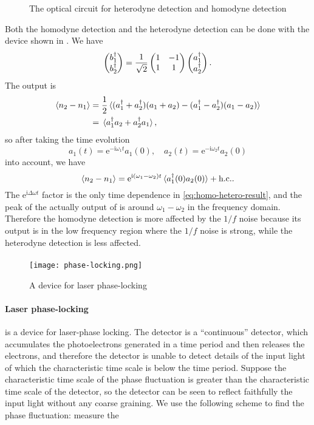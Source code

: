 \documentclass[hyperref, a4paper]{article}
\newcommand*{\ii}{\mathrm{i}}
\newcommand*{\ee}{\mathrm{e}}
\begin{document}
\begin{figure}
    \centering
    
    \caption{The optical circuit for heterodyne detection and homodyne detection}
    \label{fig:hom-hetero-device}
\end{figure}

Both the homodyne detection and the heterodyne detection can be done with the device shown in .
We have 
\[
    \pmqty{b_1^\dagger \\ b_2^\dagger} = \frac{1}{\sqrt{2}} \pmqty{1 & -1 \\ 1 & 1 } \pmqty{a^\dagger_1 \\ a_2^\dagger}.
\]
The output is 
\[
    \begin{aligned}
        \expval{n_2 - n_1} &= \frac{1}{2} \expval*{(a_1^\dagger + a_2^\dagger) (a_1 + a_2) - (a_1^\dagger - a_2^\dagger) (a_1 - a_2)} \\
        &= \expval*{a^\dagger_1 a_2 + a^\dagger_2 a_1},
    \end{aligned}
\]
so after taking the time evolution 
\[
    a_1(t) = \ee^{- \ii \omega_1 t} a_1(0), \quad a_2(t) = \ee^{- \ii \omega_2 t} a_2(0) 
\] 
into account, we have 
\begin{equation}
    \expval{n_2 - n_1} = \ee^{\ii (\omega_1 - \omega_2) t} \expval*{a_1^\dagger(0) a_2(0)} + \text{h.c.}.
    \label{eq:homo-hetero-result}
\end{equation}
The $\ee^{\ii \Delta \omega t}$ factor is the only time dependence in \eqref{eq:homo-hetero-result}, and the peak of the actually output of  is around $\omega_1 - \omega_2$ in the frequency domain.
Therefore the homodyne detection is more affected by the $1/f$ noise because its output is in the low frequency region where the $1/f$ noise is strong, while the heterodyne detection is less affected.

\paragraph{} 

\begin{figure}
    \centering
    \texttt{[image: phase-locking.png]}
    \caption{A device for laser phase-locking}
    \label{fig:phase-locking}
\end{figure}

\paragraph{Laser phase-locking}  is a device for laser-phase locking. 
The detector is a ``continuous'' detector, which accumulates the photoelectrons generated in a time period and then releases the 
electrons, and therefore the detector is unable to detect details of the input light of which the characteristic time scale is 
below the time period. Suppose the characteristic time scale of the phase fluctuation is greater than the characteristic time scale of the detector, so the detector can be seen to reflect faithfully the input light without any coarse graining.
We use the following scheme to find the phase fluctuation: measure the  
\end{document}
